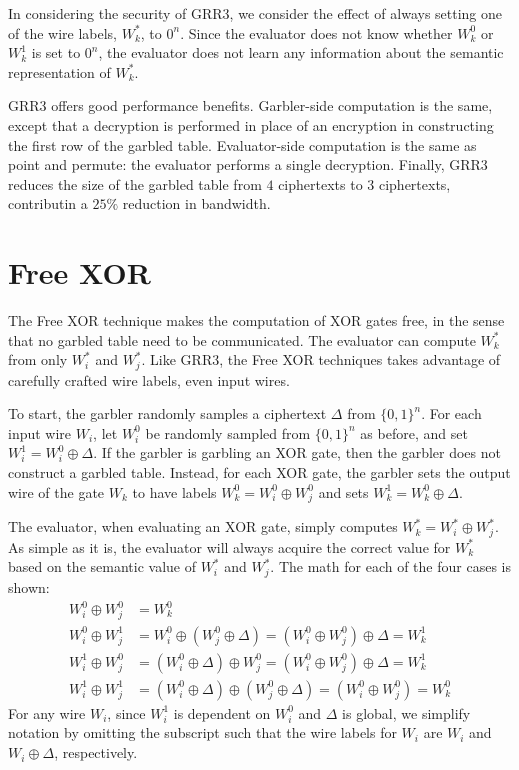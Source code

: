 In considering the security of GRR3, we consider the effect of always setting one of the wire labels, $W_k^*$, to $0^n$.
Since the evaluator does not know whether $W_k^0$ or $W_k^1$ is set to $0^n$, the evaluator does not learn any information about the semantic representation of $W_k^*$.

GRR3 offers good performance benefits.
Garbler-side computation is the same, except that a decryption is performed in place of an encryption in constructing the first row of the garbled table.
Evaluator-side computation is the same as point and permute: the evaluator performs a single decryption.
Finally, GRR3 reduces the size of the garbled table from $4$ ciphertexts to $3$ ciphertexts, contributin a $25\%$ reduction in bandwidth.

\section{Free XOR}
The Free XOR technique makes the computation of XOR gates free, in the sense that no garbled table need to be communicated.
The evaluator can compute $W_k^*$ from only $W_i^*$ and $W_j^*$.
Like GRR3, the Free XOR techniques takes advantage of carefully crafted wire labels, even input wires.

To start, the garbler randomly samples a ciphertext $\Delta$ from $\{0,1\}^n$.
For each input wire $W_i$, let $W_i^0$ be randomly sampled from $\{0,1\}^n$ as before, and set $W_i^1 = W_i^0 \oplus \Delta$.
If the garbler is garbling an XOR gate, then the garbler does not construct a garbled table.
Instead, for each XOR gate, the garbler sets the output wire of the gate $W_k$ to have labels $W_k^0 = W_i^0 \oplus W_j^0$ and sets $W_k^1 = W_k^0 \oplus \Delta$.

The evaluator, when evaluating an XOR gate, simply computes $W_k^* = W_i^* \oplus W_j^*$.
As simple as it is, the evaluator will always acquire the correct value for $W_k^*$ based on the semantic value of $W_i^*$ and $W_j^*$.
The math for each of the four cases is shown:
\begin{align}
    W_i^0 \oplus W_j^0 & = W_k^0 \\
    W_i^0 \oplus W_j^1 & = W_i^0 \oplus (W_j^0 \oplus \Delta) = (W_i^0 \oplus W_j^0) \oplus \Delta = W_k^1 \\
    W_i^1 \oplus W_j^0 & = (W_i^0 \oplus \Delta) \oplus W_j^0 = (W_i^0 \oplus W_j^0) \oplus \Delta = W_k^1 \\
    W_i^1 \oplus W_j^1 & = (W_i^0 \oplus \Delta) \oplus (W_j^0 \oplus \Delta) = (W_i^0 \oplus W_j^0) = W_k^0
\end{align}
For any wire $W_i$, since $W_i^1$ is dependent on $W_i^0$ and $\Delta$ is global, we simplify notation by omitting the subscript such that the wire labels for $W_i$ are $W_i$ and $W_i \oplus \Delta$, respectively.

